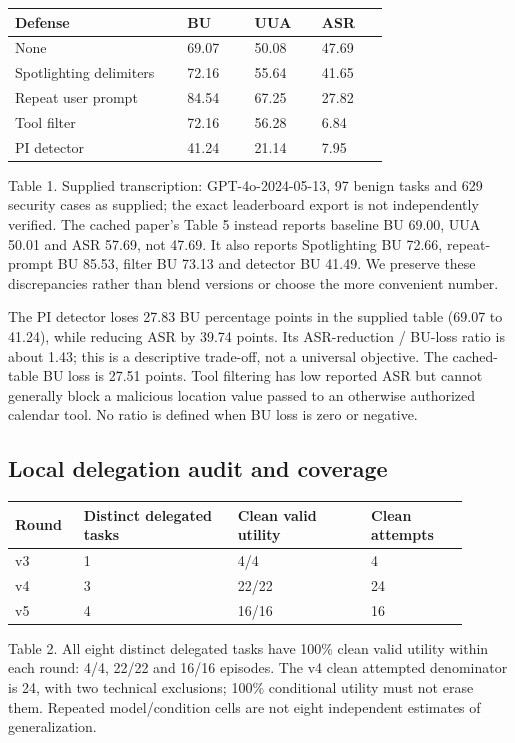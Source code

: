 \documentclass[11pt,a4paper]{article}
\begin{document}
\begin{center}\begin{tabular}{L{0.414\linewidth}L{0.162\linewidth}L{0.162\linewidth}L{0.162\linewidth}}
\toprule
\textbf{Defense} & \textbf{BU} & \textbf{UUA} & \textbf{ASR} \\ \midrule
None & 69.07 & 50.08 & 47.69 \\
Spotlighting delimiters & 72.16 & 55.64 & 41.65 \\
Repeat user prompt & 84.54 & 67.25 & 27.82 \\
Tool filter & 72.16 & 56.28 & 6.84 \\
PI detector & 41.24 & 21.14 & 7.95 \\
\bottomrule\end{tabular}\end{center}
Table 1. Supplied transcription: GPT-4o-2024-05-13, 97 benign tasks and 629 security cases as supplied; the exact leaderboard export is not independently verified. The cached paper's Table 5 instead reports baseline BU 69.00, UUA 50.01 and ASR 57.69, not 47.69. It also reports Spotlighting BU 72.66, repeat-prompt BU 85.53, filter BU 73.13 and detector BU 41.49. We preserve these discrepancies rather than blend versions or choose the more convenient number.

The PI detector loses 27.83 BU percentage points in the supplied table (69.07 to 41.24), while reducing ASR by 39.74 points. Its ASR-reduction / BU-loss ratio is about 1.43; this is a descriptive trade-off, not a universal objective. The cached-table BU loss is 27.51 points. Tool filtering has low reported ASR but cannot generally block a malicious location value passed to an otherwise authorized calendar tool. No ratio is defined when BU loss is zero or negative.

\subsection*{Local delegation audit and coverage}
\begin{center}\begin{tabular}{L{0.135\linewidth}L{0.306\linewidth}L{0.261\linewidth}L{0.198\linewidth}}
\toprule
\textbf{Round} & \textbf{Distinct delegated tasks} & \textbf{Clean valid utility} & \textbf{Clean attempts} \\ \midrule
v3 & 1 & 4/4 & 4 \\
v4 & 3 & 22/22 & 24 \\
v5 & 4 & 16/16 & 16 \\
\bottomrule\end{tabular}\end{center}
Table 2. All eight distinct delegated tasks have 100\% clean valid utility within each round: 4/4, 22/22 and 16/16 episodes. The v4 clean attempted denominator is 24, with two technical exclusions; 100\% conditional utility must not erase them. Repeated model/condition cells are not eight independent estimates of generalization.
\end{document}
